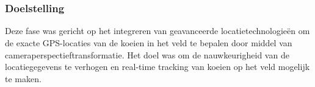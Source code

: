 \chapter{}%
\label{ch:localisatie}

\subsection{Doelstelling}
Deze fase was gericht op het integreren van geavanceerde locatietechnologieën om de exacte GPS-locaties van de koeien in het veld te bepalen door middel van cameraperspectieftransformatie. Het doel was om de nauwkeurigheid van de locatiegegevens te verhogen en real-time tracking van koeien op het veld mogelijk te maken.

